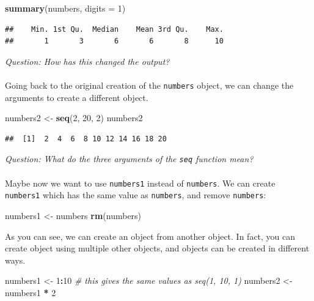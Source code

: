\documentclass[
]{book}
\newenvironment{Shaded}{\begin{snugshade}}{\end{snugshade}}
\newcommand{\CommentTok}[1]{\textcolor[rgb]{0.56,0.35,0.01}{\textit{#1}}}
\newcommand{\DataTypeTok}[1]{\textcolor[rgb]{0.13,0.29,0.53}{#1}}
\newcommand{\DecValTok}[1]{\textcolor[rgb]{0.00,0.00,0.81}{#1}}
\newcommand{\KeywordTok}[1]{\textcolor[rgb]{0.13,0.29,0.53}{\textbf{#1}}}
\newcommand{\NormalTok}[1]{#1}
\newcommand{\OperatorTok}[1]{\textcolor[rgb]{0.81,0.36,0.00}{\textbf{#1}}}
\newcommand{\StringTok}[1]{\textcolor[rgb]{0.31,0.60,0.02}{#1}}
\begin{document}
\begin{Shaded}
\begin{Highlighting}[]
\KeywordTok{summary}\NormalTok{(numbers, }\DataTypeTok{digits =} \DecValTok{1}\NormalTok{)}
\end{Highlighting}
\end{Shaded}

\begin{verbatim}
##    Min. 1st Qu.  Median    Mean 3rd Qu.    Max. 
##       1       3       6       6       8      10
\end{verbatim}

\emph{Question: How has this changed the output?}\\
~\\

Going back to the original creation of the \texttt{numbers} object, we can change the
arguments to create a different object.

\begin{Shaded}
\begin{Highlighting}[]
\NormalTok{numbers2 <-}\StringTok{ }\KeywordTok{seq}\NormalTok{(}\DecValTok{2}\NormalTok{, }\DecValTok{20}\NormalTok{, }\DecValTok{2}\NormalTok{)}
\NormalTok{numbers2}
\end{Highlighting}
\end{Shaded}

\begin{verbatim}
##  [1]  2  4  6  8 10 12 14 16 18 20
\end{verbatim}

\emph{Question: What do the three arguments of the \texttt{seq} function mean?}\\
~\\

Maybe now we want to use \texttt{numbers1} instead of \texttt{numbers}. We can create \texttt{numbers1}
which has the same value as \texttt{numbers}, and remove \texttt{numbers}:

\begin{Shaded}
\begin{Highlighting}[]
\NormalTok{numbers1 <-}\StringTok{ }\NormalTok{numbers}
\KeywordTok{rm}\NormalTok{(numbers)}
\end{Highlighting}
\end{Shaded}

As you can see, we can create an object from another object. In fact, you can
create object using multiple other objects, and objects can be created in
different ways.

\begin{Shaded}
\begin{Highlighting}[]
\NormalTok{numbers1 <-}\StringTok{ }\DecValTok{1}\OperatorTok{:}\DecValTok{10}  \CommentTok{# this gives the same values as seq(1, 10, 1)}
\NormalTok{numbers2 <-}\StringTok{ }\NormalTok{numbers1 }\OperatorTok{*}\StringTok{ }\DecValTok{2}
\end{Highlighting}
\end{Shaded}
\end{document}
